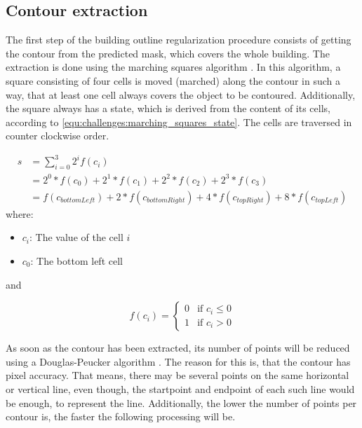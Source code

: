\subsection{Contour extraction}
The first step of the building outline regularization procedure consists of getting the contour from the predicted mask, which covers the whole building. The extraction is done using the marching squares algorithm \cite{Maple.2003}. In this algorithm, a square consisting of four cells is moved (marched) along the contour in such a way, that at least one cell always covers the object to be contoured. Additionally, the square always has a state, which is derived from the content of its cells, according to \eqref{equ:challenges:marching_squares_state}. The cells are traversed in counter clockwise order.

\newenvironment{conditions}
  {\par\vspace{\abovedisplayskip}\noindent\begin{tabular}{>{$}l<{$} @{${}={}$} l}}
  {\end{tabular}\par\vspace{\belowdisplayskip}}

\begin{equation}
\begin{split}
	s	&= \displaystyle\sum_{i=0}^3 2^i f(c_i) \\
		&= 2^0 * f(c_0) + 2^1 * f(c_1) + 2^2 * f(c_2) + 2^3 * f(c_3) \\
		&= f(c_{bottomLeft}) + 2 * f(c_{bottomRight}) + 4 * f(c_{topRight}) + 8 * f(c_{topLeft})
	\label{equ:challenges:marching_squares_state}
\end{split}
\end{equation}
where:
\begin{itemize}[label=]
    \item $c_i$: The value of the cell $i$
    \item $c_0$: The bottom left cell
\end{itemize}

and

\[ f(c_i) =
  \begin{cases}
    0  & \text{if $c_i \leq 0$}\\
    1  & \text{if $c_i > 0$}
  \end{cases}
\]


As soon as the contour has been extracted, its number of points will be reduced using a Douglas-Peucker algorithm \cite{DOUGLAS.1973}. The reason for this is, that the contour has pixel accuracy. That means, there may be several points on the same horizontal or vertical line, even though, the startpoint and endpoint of each such line would be enough, to represent the line. Additionally, the lower the number of points per contour is, the faster the following processing will be.

